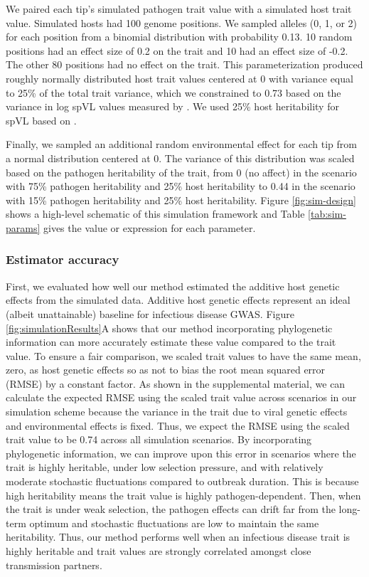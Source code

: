 \documentclass[11pt]{article}
\begin{document}
\begin{linenumbers}
We paired each tip's simulated pathogen trait value with a simulated host trait value. Simulated hosts had 100 genome positions. We sampled alleles (0, 1, or 2) for each position from a binomial distribution with probability 0.13. 10 random positions had an effect size of 0.2 on the trait and 10 had an effect size of -0.2. The other 80 positions had no effect on the trait. This parameterization produced roughly normally distributed host trait values centered at 0 with variance equal to 25\% of the total trait variance, which we constrained to 0.73 based on the variance in log spVL values measured by \cite{Mitov2018}. We used 25\% host heritability for spVL based on \cite{McLaren2015}.

Finally, we sampled an additional random environmental effect for each tip from a normal distribution centered at 0. The variance of this distribution was scaled based on the pathogen heritability of the trait, from 0 (no affect) in the scenario with 75\% pathogen heritability and 25\% host heritability to 0.44 in the scenario with 15\% pathogen heritability and 25\% host heritability. Figure \ref{fig:sim-design} shows a high-level schematic of this simulation framework and Table \ref{tab:sim-params} gives the value or expression for each parameter.

\subsubsection*{Estimator accuracy}

First, we evaluated how well our method estimated the additive host genetic effects from the simulated data. Additive host genetic effects represent an ideal (albeit unattainable) baseline for infectious disease GWAS. Figure \ref{fig:simulationResults}A shows that our method incorporating phylogenetic information can more accurately estimate these value compared to the trait value. To ensure a fair comparison, we scaled trait values to have the same mean, zero, as host genetic effects so as not to bias the root mean squared error (RMSE) by a constant factor. As shown in the supplemental material, we can calculate the expected RMSE using the scaled trait value across scenarios in our simulation scheme because the variance in the trait due to viral genetic effects and environmental effects is fixed. Thus, we expect the RMSE using the scaled trait value to be 0.74 across all simulation scenarios. By incorporating phylogenetic information, we can improve upon this error in scenarios where the trait is highly heritable, under low selection pressure, and with relatively moderate stochastic fluctuations compared to outbreak duration. This is because high heritability means the trait value is highly pathogen-dependent. Then, when the trait is under weak selection, the pathogen effects can drift far from the long-term optimum and stochastic fluctuations are low to maintain the same heritability. Thus, our method performs well when an infectious disease trait is highly heritable and trait values are strongly correlated amongst close transmission partners.


\end{linenumbers}
\end{document}
